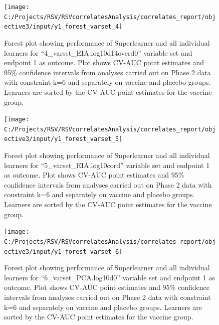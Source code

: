 \documentclass[11pt]{article}
\begin{document}
\begin{figure}[H]

{\centering \texttt{[image: C:/Projects/RSV/RSVcorrelatesAnalysis/correlates\_report/objective3/input/y1\_forest\_varset\_4]} 

}

\caption[Forest plot for ``4\_varset\_EIA.log10d14overd0'' variable set, endpoint 1.]{Forest plot showing performance of Superlearner and all individual learners for ``4\_varset\_EIA.log10d14overd0'' variable set and endpoint 1 as outcome. Plot shows CV-AUC point estimates and 95\% confidence intervals from analyses carried out on Phase 2 data with constraint k=6 and separately on vaccine and placebo groups. Learners are sorted by the CV-AUC point estimates for the vaccine group.}\label{fig:y1-forest-varset-4}
\end{figure}

\begin{figure}[H]

{\centering \texttt{[image: C:/Projects/RSV/RSVcorrelatesAnalysis/correlates\_report/objective3/input/y1\_forest\_varset\_5]} 

}

\caption[Forest plot for ``5\_varset\_EIA.log10cord'' variable set, endpoint 1.]{Forest plot showing performance of Superlearner and all individual learners for ``5\_varset\_EIA.log10cord'' variable set and endpoint 1 as outcome. Plot shows CV-AUC point estimates and 95\% confidence intervals from analyses carried out on Phase 2 data with constraint k=6 and separately on vaccine and placebo groups. Learners are sorted by the CV-AUC point estimates for the vaccine group.}\label{fig:y1-forest-varset-5}
\end{figure}

\begin{figure}[H]

{\centering \texttt{[image: C:/Projects/RSV/RSVcorrelatesAnalysis/correlates\_report/objective3/input/y1\_forest\_varset\_6]} 

}

\caption[Forest plot for ``6\_varset\_PCA.log10d0'' variable set, endpoint 1.]{Forest plot showing performance of Superlearner and all individual learners for ``6\_varset\_PCA.log10d0'' variable set and endpoint 1 as outcome. Plot shows CV-AUC point estimates and 95\% confidence intervals from analyses carried out on Phase 2 data with constraint k=6 and separately on vaccine and placebo groups. Learners are sorted by the CV-AUC point estimates for the vaccine group.}\label{fig:y1-forest-varset-6}
\end{figure}
\end{document}

